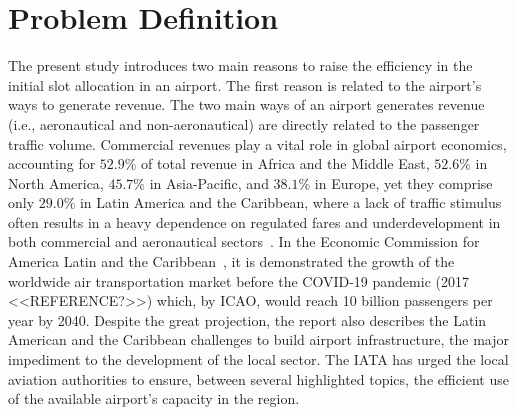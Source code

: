 \section{Problem Definition}
\label{sec:ProblemDefinition}

The present study introduces two main reasons to raise the efficiency in the
initial slot allocation in an airport.
%
The first reason is related to the airport's ways to generate revenue.
%
The two main ways of an airport generates revenue (i.e., aeronautical and
non-aeronautical) are directly related to the passenger traffic volume.
%
Commercial revenues play a vital role in global airport economics, accounting
for $52.9\%$ of total revenue in Africa and the Middle East, $52.6\%$ in North
America, $45.7\%$ in Asia-Pacific, and $38.1\%$ in Europe, yet they comprise
only $29.0\%$ in Latin America and the Caribbean, where a lack of traffic
stimulus often results in a heavy dependence on regulated fares and
underdevelopment in both commercial and aeronautical
sectors~\cite{graham2009important}.
%
In the Economic Commission for America Latin and the
Caribbean~\cite{planzer2019airport}, it is demonstrated the growth of the
worldwide air transportation market before the COVID-19 pandemic (2017
<<REFERENCE?>>) which, by \acrfull{ICAO}, would reach 10 billion passengers per
year by 2040.
%
Despite the great projection, the report also describes the Latin American and
the Caribbean challenges to build airport infrastructure, the major impediment
to the development of the local sector.
%
The \acrfull{IATA} has urged the local aviation authorities to ensure, between
several highlighted topics, the efficient use of the available airport’s
capacity in the region.



